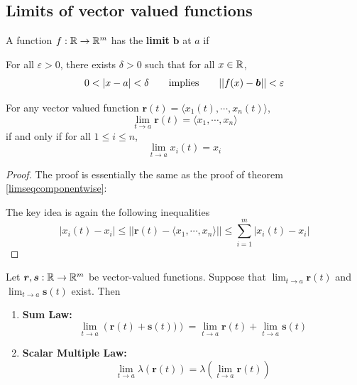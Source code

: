 \subsection{Limits of vector valued functions}\label{limvectorval}

\begin{definition}
    A function $f : \mathbb{R} \to \mathbb{R}^m$ has the \textbf{limit} $\bm{b}$ at $a$ if
    
    \vspace{1em}
    For all $\varepsilon>0$, there exists $\delta > 0$ such that for all $x \in \mathbb{R}$, $$0 < |x-a| < \delta \qquad \textnormal{implies} \qquad ||f(x) - \bm{b} || < \varepsilon$$
    
    \end{definition}


\begin{theorem}\label{vecvalcomponents}
    For any vector valued function $\bm{r}(t) = \langle x_1(t), \cdots, x_n(t) \rangle$, $$\lim_{t \to a} \bm{r}(t) = \langle x_1, \cdots, x_n \rangle$$ if and only if for all $1 \leq i \leq n$, $$\lim_{t \to a} x_i(t) = x_i$$
    
    
    \end{theorem}

    \begin{proof}
    The proof is essentially the same as the proof of theorem \ref{limseqcomponentwise}:
    
    The key idea is again the following inequalities $$|x_i(t) - x_i| \leq ||\bm{r}(t) - \langle x_1, \cdots, x_n \rangle|| \leq \sum_{i=1}^m |x_i(t) - x_i|$$
    
    
    
    \end{proof}

    


\begin{theorem}
    Let $\bm{r},\bm{s} : \mathbb{R} \to \mathbb{R}^m$ be vector-valued functions. Suppose that $\lim_{t \to a}\bm{r}(t)$ and $\lim_{t \to a}\bm{s}(t)$ exist. Then 
    
    \begin{enumerate}
        \item \textbf{Sum Law:} $$\lim_{t \to a} \left(\bm{r}(t) + \bm{s}(t))\right) = \lim_{t \to a} \bm{r}(t) + \lim_{t \to a} \bm{s}(t)$$
        \item \textbf{Scalar Multiple Law:} $$\lim_{t \to a} \lambda(\bm{r}(t)) = \lambda \left(\lim_{t \to a} \bm{r}(t) \right)$$
    \end{enumerate}
    
    
    \end{theorem}



